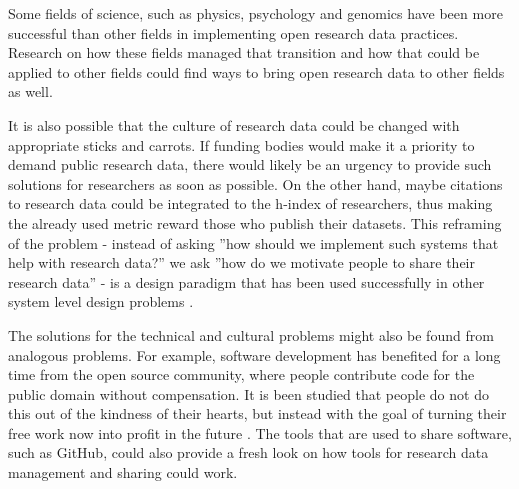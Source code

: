 Some fields of science, such as physics, psychology and genomics have been
more successful than other fields in implementing open research data practices.
Research on how these fields managed that transition and how that could be applied
to other fields could find ways to bring open research data to other
fields as well.

It is also possible that the culture of research data could be changed with
appropriate sticks and carrots. If funding bodies would make it a priority
to demand public research data, there would likely be an urgency to provide
such solutions for researchers as soon as possible. On the other hand, maybe
citations to research data could be integrated to the h-index of researchers,
thus making the already used metric reward those who publish their datasets.
This reframing of the problem - instead of asking ''how should we implement
such systems that help with research data?'' we ask ''how do we motivate people
to share their research data'' - is a design paradigm that has been used
successfully in other system level design problems \cite{dorst2015frame}.

The solutions for the technical and cultural problems might also be found
from analogous problems. For example, software development has benefited for
a long time from the open source community, where people contribute code for
the public domain without compensation. It is been studied that people do not
do this out of the kindness of their hearts, but instead with the goal of
turning their free work now into profit in the future
\cite{DBLP:conf/hicss/HarsO01}. The tools that are used to share software,
such as GitHub, could also provide a fresh look on how tools for research
data management and sharing could work.

\iffalse
In this chapter we will discuss the findings, methods and such in a good
scientific manner.

At some point I want to discuss the analogue of software open source community
and how that works - how we should make people proud of making good, usable
datasets and sharing them.

\cite{DBLP:conf/hicss/HarsO01} is about the motivations behind working on open
source software - could be used for analogue for open data.

\cite{dorst2015frame} is the Kees Dorst book about reframing problems, which in
this case would be taking the technical problem of sharing reserch data, which
is not the actual problem, and reframing it as the problem on how to motivat
people to to share their data.
\fi
